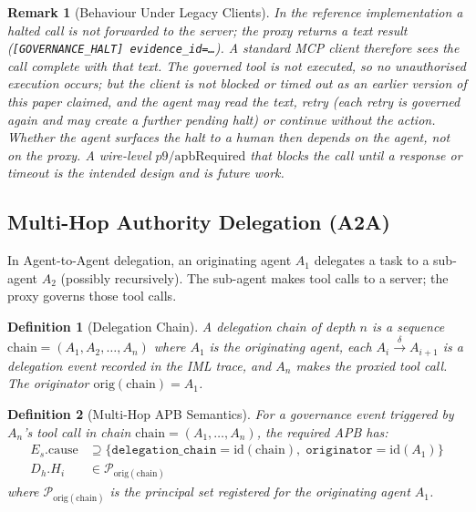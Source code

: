 \documentclass[11pt]{article}
\newtheorem{definition}{Definition}[section]
\newtheorem{remark}{Remark}[section]
\newcommand{\Pset}{\mathcal{P}}
\newcommand{\Es}{E_s}
\newcommand{\Dh}{D_h}
\newcommand{\Hi}{H_i}
\newcommand{\delegateto}{\xrightarrow{\delta}}
\newcommand{\chain}{\mathrm{chain}}
\newcommand{\orig}{\mathrm{orig}}
\begin{document}
\begin{remark}[Behaviour Under Legacy Clients]
\label{rem:backward}
In the reference implementation a halted call is \emph{not} forwarded to
the server; the proxy returns a text result
(\texttt{[GOVERNANCE\_HALT] evidence\_id=\ldots}). A standard MCP client
therefore sees the call \emph{complete} with that text. The governed
tool is not executed, so no unauthorised execution occurs; but the
client is not blocked or timed out as an earlier version of this paper
claimed, and the agent may read the text, retry (each retry is governed
again and may create a further pending halt) or continue without the
action. Whether the agent surfaces the halt to a human then depends on
the agent, not on the proxy. A wire-level $p9/\mathrm{apbRequired}$ that
blocks the call until a response or timeout is the intended design and
is future work.
\end{remark}

\subsection{Multi-Hop Authority Delegation (A2A)}
\label{sec:a2a}

In Agent-to-Agent delegation, an originating agent $A_1$ delegates
a task to a sub-agent $A_2$ (possibly recursively). The sub-agent
makes tool calls to a server; the proxy governs those tool calls.

\begin{definition}[Delegation Chain]
\label{def:delegation-chain}
A \emph{delegation chain} of depth $n$ is a sequence
$\chain = (A_1, A_2, \ldots, A_n)$ where $A_1$ is the
\emph{originating agent}, each $A_i \delegateto A_{i+1}$ is
a delegation event recorded in the IML trace, and $A_n$ makes
the proxied tool call. The originator $\orig(\chain) = A_1$.
\end{definition}

\begin{definition}[Multi-Hop APB Semantics]
\label{def:mhapb}
For a governance event triggered by $A_n$'s tool call in chain
$\chain = (A_1, \ldots, A_n)$, the required APB has:
\begin{align*}
  \Es.\text{cause} &\supseteq \{
    \texttt{delegation\_chain} = \mathrm{id}(\chain),\;
    \texttt{originator} = \mathrm{id}(A_1)
  \}\\
  \Dh.\Hi &\in \Pset_{\orig(\chain)}
\end{align*}
where $\Pset_{\orig(\chain)}$ is the principal set registered for the
originating agent $A_1$.
\end{definition}
\end{document}
